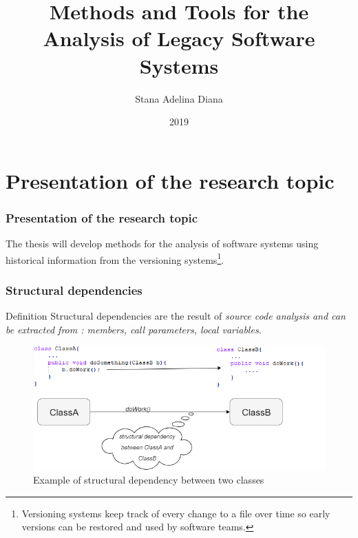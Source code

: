 \documentclass{beamer}
\title[Pres]{Methods and Tools for the Analysis of Legacy Software Systems}
\author{Stana Adelina Diana}
\institute{Computer Science and Engineering Department\\
"Politehnica" University of Timisoara}
\date{2019}
\begin{document}
\begin{frame}
  \titlepage
\end{frame}

\section{Presentation of the research topic}
 \begin{frame}
\frametitle{Presentation of the research topic}
 The thesis will develop methods for the analysis of software systems
 using historical information from the versioning systems\footnote{Versioning systems keep track of every change to a file over time so early versions can be restored and used by software teams.}. 
\end{frame}


 \begin{frame}
\frametitle{Structural dependencies}
\begin{block}{Definition}
Structural dependencies are the result of \it{source code analysis} and can be extracted from : members, call parameters, local variables. 
\end{block}

\begin{center}
     \begin{figure}
	\includegraphics[width=\textwidth]{structural_dep.png}
	\caption{\label{fig:fig}Example of structural dependency between two classes}
     \end{figure}
\end{center}

\end{frame}

\end{document}
